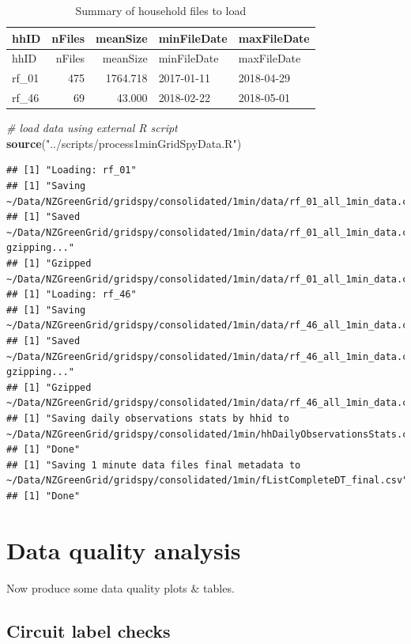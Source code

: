 \documentclass[]{article}
\newenvironment{Shaded}{\begin{snugshade}}{\end{snugshade}}
\newcommand{\KeywordTok}[1]{\textcolor[rgb]{0.13,0.29,0.53}{\textbf{#1}}}
\newcommand{\StringTok}[1]{\textcolor[rgb]{0.31,0.60,0.02}{#1}}
\newcommand{\CommentTok}[1]{\textcolor[rgb]{0.56,0.35,0.01}{\textit{#1}}}
\newcommand{\NormalTok}[1]{#1}
\begin{document}
\begin{longtable}[]{@{}lrrll@{}}
\caption{Summary of household files to load}\tabularnewline
\toprule
hhID & nFiles & meanSize & minFileDate & maxFileDate\tabularnewline
\midrule
\endfirsthead
\toprule
hhID & nFiles & meanSize & minFileDate & maxFileDate\tabularnewline
\midrule
\endhead
rf\_01 & 475 & 1764.718 & 2017-01-11 & 2018-04-29\tabularnewline
rf\_46 & 69 & 43.000 & 2018-02-22 & 2018-05-01\tabularnewline
\bottomrule
\end{longtable}

\begin{Shaded}
\begin{Highlighting}[]
\CommentTok{# load data using external R script}
\KeywordTok{source}\NormalTok{(}\StringTok{"../scripts/process1minGridSpyData.R"}\NormalTok{)}
\end{Highlighting}
\end{Shaded}

\begin{verbatim}
## [1] "Loading: rf_01"
## [1] "Saving ~/Data/NZGreenGrid/gridspy/consolidated/1min/data/rf_01_all_1min_data.csv..."
## [1] "Saved ~/Data/NZGreenGrid/gridspy/consolidated/1min/data/rf_01_all_1min_data.csv, gzipping..."
## [1] "Gzipped ~/Data/NZGreenGrid/gridspy/consolidated/1min/data/rf_01_all_1min_data.csv"
## [1] "Loading: rf_46"
## [1] "Saving ~/Data/NZGreenGrid/gridspy/consolidated/1min/data/rf_46_all_1min_data.csv..."
## [1] "Saved ~/Data/NZGreenGrid/gridspy/consolidated/1min/data/rf_46_all_1min_data.csv, gzipping..."
## [1] "Gzipped ~/Data/NZGreenGrid/gridspy/consolidated/1min/data/rf_46_all_1min_data.csv"
## [1] "Saving daily observations stats by hhid to ~/Data/NZGreenGrid/gridspy/consolidated/1min/hhDailyObservationsStats.csv"
## [1] "Done"
## [1] "Saving 1 minute data files final metadata to ~/Data/NZGreenGrid/gridspy/consolidated/1min/fListCompleteDT_final.csv"
## [1] "Done"
\end{verbatim}

\section{Data quality analysis}\label{data-quality-analysis}

Now produce some data quality plots \& tables.

\subsection{Circuit label checks}\label{circuit-label-checks}
\end{document}
